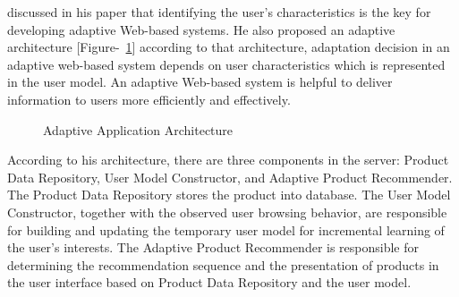 \citet{Lo2006} discussed in his paper that identifying the user's
characteristics is the key for developing adaptive Web-based systems. He also
proposed an adaptive architecture
[Figure-~\ref{AdaptiveApplicationArchitecture}] according to that architecture, 
adaptation decision in an adaptive web-based system depends on user
characteristics which is represented in the user model. An adaptive Web-based
system is helpful to deliver information to users more efficiently and
effectively.
\begin{figure}[h!t]
    \centering
  \caption{Adaptive Application Architecture}
  \label{AdaptiveApplicationArchitecture}
\end{figure}

According to his architecture, there are three components in the server: Product
Data Repository, User Model Constructor, and Adaptive Product Recommender. The
Product Data Repository stores the product into database. The User Model
Constructor, together with the observed user browsing behavior, are responsible
for building and updating the temporary user model for incremental learning of
the user's interests. The Adaptive Product Recommender is responsible for
determining the recommendation sequence and the presentation of products in the
user interface based on Product Data Repository and the user model.

